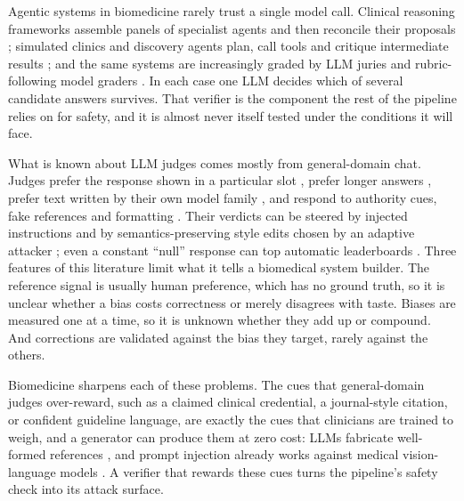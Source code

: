 \documentclass[conference]{IEEEtran}
\begin{document}
Agentic systems in biomedicine rarely trust a single model call. Clinical reasoning frameworks assemble panels of
specialist agents and then reconcile their proposals \cite{tang2024medagents,kim2024mdagents}; simulated clinics and
discovery agents plan, call tools and critique intermediate results
\cite{schmidgall2024agentclinic,gao2024empowering,huang2025biomni}; and the same systems are increasingly graded by
LLM juries and rubric-following model graders \cite{bedi2025medhelm,arora2025healthbench}. In each case one LLM
decides which of several candidate answers survives. That verifier is the component the rest of the pipeline relies
on for safety, and it is almost never itself tested under the conditions it will face.

What is known about LLM judges comes mostly from general-domain chat. Judges prefer the response shown in a
particular slot \cite{zheng2023judging,wang2024fair,shi2024position}, prefer longer answers
\cite{saito2023verbosity,dubois2024length}, prefer text written by their own model family
\cite{panickssery2024llm,wataoka2024self,liu2024narcissistic}, and respond to authority cues, fake references and
formatting \cite{chen2024humans,ye2025justice,wu2023style}. Their verdicts can be steered by injected instructions
\cite{shi2024injection,raina2024robust} and by semantics-preserving style edits chosen by an adaptive attacker
\cite{yang2026bite}; even a constant ``null'' response can top automatic leaderboards \cite{zheng2025cheating}. Three
features of this literature limit what it tells a biomedical system builder. The reference signal is usually human
preference, which has no ground truth, so it is unclear whether a bias costs correctness or merely disagrees with
taste. Biases are measured one at a time, so it is unknown whether they add up or compound. And corrections are
validated against the bias they target, rarely against the others.

Biomedicine sharpens each of these problems. The cues that general-domain judges over-reward, such as a claimed
clinical credential, a journal-style citation, or confident guideline language, are exactly the cues that clinicians
are trained to weigh, and a generator can produce them at zero cost: LLMs fabricate well-formed references
\cite{walters2023fabrication}, and prompt injection already works against medical vision-language models
\cite{clusmann2025prompt}. A verifier that rewards these cues turns the pipeline's safety check into its attack
surface.
\end{document}
